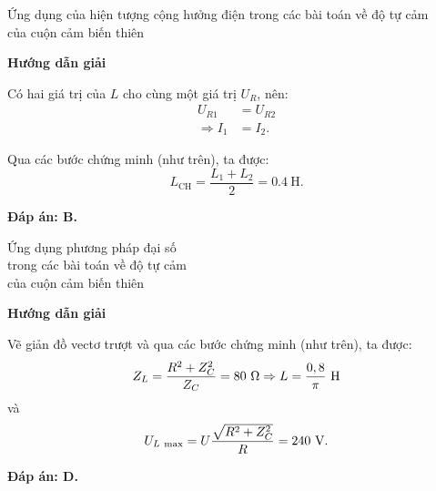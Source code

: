\begin{dang}{Ứng dụng của hiện tượng cộng hưởng điện trong các bài toán về độ tự cảm\\ của cuộn cảm biến thiên}
{	}
	{\begin{center}
			\textbf{Hướng dẫn giải}
		\end{center}
		Có hai giá trị của $L$ cho cùng một giá trị $U_R$, nên:
		\begin{align*}
			U_{R1}&=U_{R2} \\
			\Rightarrow I_1 &= I_2.
		\end{align*}
		
		Qua các bước chứng minh (như trên), ta được:
		\begin{equation*}
			L_\text{CH}=\dfrac{L_1+L_2}{2}=\SI{0.4}{\henry}.
		\end{equation*}
		
		\textbf{Đáp án: B.}
	}
\end{dang}
\begin{dang}{Ứng dụng phương pháp đại số\\ trong các bài toán về độ tự cảm\\ của cuộn cảm biến thiên}
	{\begin{center}
			\textbf{Hướng dẫn giải}
		\end{center}
		Vẽ giản đồ vectơ trượt và qua các bước chứng minh (như trên), ta được:
		\begin{equation*}
			Z_L = \dfrac{R^2 + Z_C ^2}{Z_C} = 80\ \Omega \Rightarrow L = \dfrac{0,8}{\pi}\ \text H
		\end{equation*}
		và
		\begin{equation*}
			U_{L\ \text{max}}=U\dfrac{\sqrt{R^2 +Z_C ^2}}{R} = 240\ \text V.
		\end{equation*}
		
		\textbf{Đáp án: D.}
	}
	

\end{dang}
